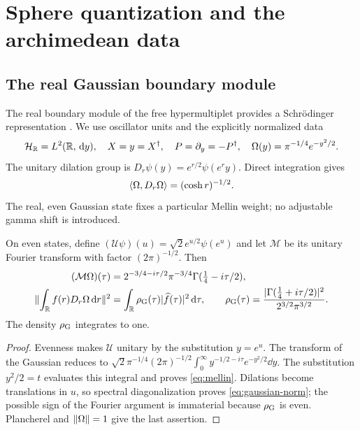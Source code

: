 \section{Sphere quantization and the archimedean data}\label{sec:sphere}
\subsection{The real Gaussian boundary module}
The real boundary module of the free hypermultiplet provides a
Schr\"odinger representation \cite[Sections 7.2--7.3]{Sphere}. We use
oscillator units and the explicitly normalized data
\begin{equation}\label{eq:gaussian-data}
 \mathcal H_{\mathbb R}=L^2(\mathbb R,\,\mathrm d y),\quad X=y=X^\dagger,\quad
 P=\partial_y=-P^\dagger,\quad
 \Omega(y)=\pi^{-1/4}e^{-y^2/2}.
\end{equation}
The unitary dilation group is $D_r\psi(y)=e^{r/2}\psi(e^ry)$.
Direct integration gives
\begin{equation}\label{eq:gaussian-correlation}
 \langle \Omega,D_r\Omega\rangle=(\cosh r)^{-1/2}.
\end{equation}
The real, even Gaussian state fixes a particular Mellin weight; no
adjustable gamma shift is introduced.

\begin{proposition}\label{prop:gaussian}
On even states, define
$(\mathcal U\psi)(u)=\sqrt2e^{u/2}\psi(e^u)$ and let
$\mathcal M$ be its unitary Fourier transform with factor $(2\pi)^{-1/2}$.
Then
\begin{align}
 (\mathcal M\Omega)(\tau)
 &=2^{-3/4-i\tau/2}\pi^{-3/4}
       \Gamma(\tfrac14-i\tau/2),\label{eq:mellin}\\
 \lVert \int_\mathbb R f(r)D_r\Omega\,\mathrm d r\rVert^2
 &=\int_\mathbb R\rho_{\rm G}(\tau)|\widehat f(\tau)|^2\,\mathrm d\tau,
 \qquad
 \rho_{\rm G}(\tau)=
 \frac{|\Gamma(\tfrac14+i\tau/2)|^2}{2^{3/2}\pi^{3/2}}.
 \label{eq:gaussian-norm}
\end{align}
The density $\rho_{\rm G}$ integrates to one.
\end{proposition}
\begin{proof}
Evenness makes $\mathcal U$ unitary by the substitution $y=e^u$.
The transform of the Gaussian reduces to
$\sqrt2\pi^{-1/4}(2\pi)^{-1/2}
\int_0^\infty y^{-1/2-i\tau}e^{-y^2/2}\dd y$.
The substitution $y^2/2=t$ evaluates this integral and proves
\eqref{eq:mellin}. Dilations become translations in $u$, so spectral
diagonalization proves \eqref{eq:gaussian-norm}; the possible sign of
the Fourier argument is immaterial because $\rho_{\rm G}$ is even.
Plancherel and $\lVert \Omega\rVert=1$ give the last assertion.
\end{proof}

